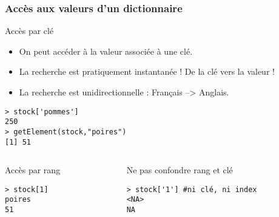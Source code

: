 \documentclass[10pt]{beamer}
\begin{document}
\begin{frame}[fragile]
  \frametitle{Accès aux valeurs d'un dictionnaire}
  \begin{alertblock}{Accès par clé}
  \begin{itemize}
  \item \alert{On peut accéder à la valeur associée à une clé.} 
  \item La recherche est pratiquement instantanée ! De la clé vers la valeur ! 
  \item La recherche est unidirectionnelle : Français --> Anglais.
  \end{itemize}
    \begin{lstlisting}
> stock['pommes']
250
> getElement(stock,"poires")
[1] 51    
\end{lstlisting}      
\end{alertblock}

\begin{columns}[t]
\begin{column}{0.4\textwidth}
\begin{block}{Accès par rang}
  \begin{lstlisting}[style=block]
> stock[1]
poires
51    
\end{lstlisting}    
\end{block}
\end{column}
\begin{column}{0.6\textwidth}
\begin{block}{Ne pas confondre rang et clé }
  \begin{lstlisting}[style=block]
> stock['1'] #ni clé, ni index
<NA>
NA
\end{lstlisting}    
\end{block}
\end{column}
\end{columns}

\end{frame}
\end{document}
